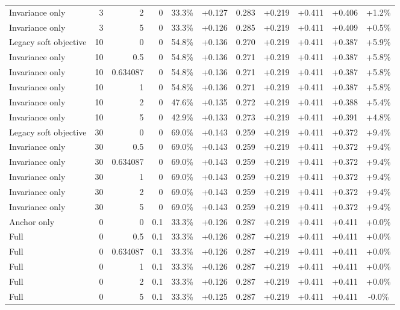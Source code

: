 \begin{table}[htbp]
\begin{tabular}{lrrrccccccc}
Invariance only & 3 & 2 & 0 & 33.3\% & +0.127 & 0.283 & +0.219 & +0.411 & +0.406 & +1.2\% \\
Invariance only & 3 & 5 & 0 & 33.3\% & +0.126 & 0.285 & +0.219 & +0.411 & +0.409 & +0.5\% \\
Legacy soft objective & 10 & 0 & 0 & 54.8\% & +0.136 & 0.270 & +0.219 & +0.411 & +0.387 & +5.9\% \\
Invariance only & 10 & 0.5 & 0 & 54.8\% & +0.136 & 0.271 & +0.219 & +0.411 & +0.387 & +5.8\% \\
Invariance only & 10 & 0.634087 & 0 & 54.8\% & +0.136 & 0.271 & +0.219 & +0.411 & +0.387 & +5.8\% \\
Invariance only & 10 & 1 & 0 & 54.8\% & +0.136 & 0.271 & +0.219 & +0.411 & +0.387 & +5.8\% \\
Invariance only & 10 & 2 & 0 & 47.6\% & +0.135 & 0.272 & +0.219 & +0.411 & +0.388 & +5.4\% \\
Invariance only & 10 & 5 & 0 & 42.9\% & +0.133 & 0.273 & +0.219 & +0.411 & +0.391 & +4.8\% \\
Legacy soft objective & 30 & 0 & 0 & 69.0\% & +0.143 & 0.259 & +0.219 & +0.411 & +0.372 & +9.4\% \\
Invariance only & 30 & 0.5 & 0 & 69.0\% & +0.143 & 0.259 & +0.219 & +0.411 & +0.372 & +9.4\% \\
Invariance only & 30 & 0.634087 & 0 & 69.0\% & +0.143 & 0.259 & +0.219 & +0.411 & +0.372 & +9.4\% \\
Invariance only & 30 & 1 & 0 & 69.0\% & +0.143 & 0.259 & +0.219 & +0.411 & +0.372 & +9.4\% \\
Invariance only & 30 & 2 & 0 & 69.0\% & +0.143 & 0.259 & +0.219 & +0.411 & +0.372 & +9.4\% \\
Invariance only & 30 & 5 & 0 & 69.0\% & +0.143 & 0.259 & +0.219 & +0.411 & +0.372 & +9.4\% \\
Anchor only & 0 & 0 & 0.1 & 33.3\% & +0.126 & 0.287 & +0.219 & +0.411 & +0.411 & +0.0\% \\
Full & 0 & 0.5 & 0.1 & 33.3\% & +0.126 & 0.287 & +0.219 & +0.411 & +0.411 & +0.0\% \\
Full & 0 & 0.634087 & 0.1 & 33.3\% & +0.126 & 0.287 & +0.219 & +0.411 & +0.411 & +0.0\% \\
Full & 0 & 1 & 0.1 & 33.3\% & +0.126 & 0.287 & +0.219 & +0.411 & +0.411 & +0.0\% \\
Full & 0 & 2 & 0.1 & 33.3\% & +0.126 & 0.287 & +0.219 & +0.411 & +0.411 & +0.0\% \\
Full & 0 & 5 & 0.1 & 33.3\% & +0.125 & 0.287 & +0.219 & +0.411 & +0.411 & -0.0\% \\

\end{tabular}
\end{table}
